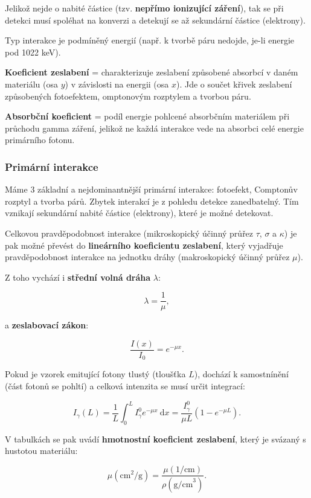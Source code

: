 Jelikož nejde o nabité částice (tzv. \textbf{nepřímo ionizující záření}), tak se při detekci musí spoléhat na konverzi a detekují se až sekundární částice (elektrony).

Typ interakce je podmíněný energií (např. k tvorbě páru nedojde, je-li energie pod 1022 keV). 

\textbf{Koeficient zeslabení} = charakterizuje zeslabení způsobené absorbcí v daném materiálu (osa $y$) v závislosti na energii (osa $x$). Jde o součet křivek zeslabení způsobených fotoefektem, omptonovým rozptylem a tvorbou páru.

\textbf{Absorbční koeficient} = podíl energie pohlcené absorbčním materiálem při průchodu gamma záření, jelikož ne každá interakce vede na absorbci celé energie primárního fotonu.

\subsubsection{Primární interakce}

Máme 3 základní a nejdominantnější primární interakce: fotoefekt, Comptonův rozptyl a tvorba párů. Zbytek interakcí je z pohledu detekce zanedbatelný. Tím vznikají sekundární nabité částice (elektrony), které je možné detekovat.

Celkovou pravděpodobnost interakce (mikroskopický účinný průřez $\tau$, $\sigma$ a $\kappa$) je pak možné převést do \textbf{lineárního koeficientu zeslabení}, který vyjadřuje pravděpodobnost interakce na jednotku dráhy (makroskopický účinný průřez $\mu$). 

Z toho vychází i \textbf{střední volná dráha} $\lambda$:

$$ \lambda = \dfrac{1}{\mu}, $$

a \textbf{zeslabovací zákon}:

$$ \boxed{ \dfrac{I(x)}{I_0} = e^{-\mu x}. } $$

Pokud je vzorek emitující fotony tlustý (tloušťka $L$), dochází k samostnínění (část fotonů se pohltí) a celková intenzita se musí určit integrací:

$$ \boxed{ I_\gamma(L) = \dfrac{1}{L} \int_0^L I_\gamma^0 e^{-\mu x} \: \text{d}x = \dfrac{I_\gamma^0}{\mu L} \left( 1 - e^{-\mu L} \right).} $$

V tabulkách se pak uvádí \textbf{hmotnostní koeficient zeslabení}, který je svázaný s hustotou materiálu:

$$ \mu(\text{cm}^2{\text{/g}}) = \dfrac{\mu(\text{1/cm})}{\rho(\text{g/cm}^3)}. $$

